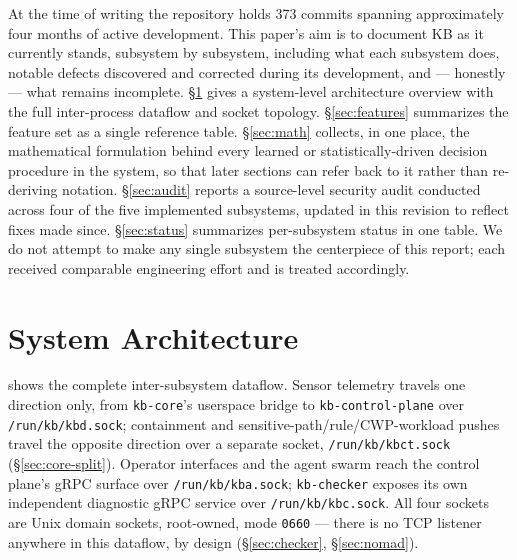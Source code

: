 \documentclass{article}
\begin{document}
At the time of writing the repository holds 373 commits spanning
approximately four months of active development. This paper's aim is
to document KB as it currently stands, subsystem by subsystem,
including what each subsystem does, notable defects discovered and
corrected during its development, and --- honestly --- what remains
incomplete. \S\ref{sec:arch} gives a system-level
architecture overview with the full inter-process dataflow and socket
topology. \S\ref{sec:features} summarizes the feature set as a single
reference table. \S\ref{sec:math} collects, in one place, the
mathematical formulation behind every learned or statistically-driven
decision procedure in the system, so that later sections can refer back
to it rather than re-deriving notation. \S\ref{sec:audit} reports a
source-level security audit conducted across four of the five
implemented subsystems, updated in this revision to reflect fixes made
since. \S\ref{sec:status} summarizes per-subsystem status in one table.
We do not attempt to make any single subsystem the centerpiece of this
report; each received comparable engineering effort and is treated
accordingly.

\section{System Architecture}
\label{sec:arch}

 shows the complete inter-subsystem dataflow. Sensor
telemetry travels one direction only, from \texttt{kb-core}'s userspace
bridge to \texttt{kb-control-plane} over \texttt{/run/kb/kbd.sock};
containment and sensitive-path/rule/CWP-workload pushes travel the
opposite direction over a separate socket, \texttt{/run/kb/kbct.sock}
(\S\ref{sec:core-split}). Operator interfaces and the agent swarm reach
the control plane's gRPC surface over \texttt{/run/kb/kba.sock};
\texttt{kb-checker} exposes its own independent diagnostic gRPC service
over \texttt{/run/kb/kbc.sock}. All four sockets are Unix domain
sockets, root-owned, mode \texttt{0660} --- there is no TCP listener
anywhere in this dataflow, by design (\S\ref{sec:checker},
\S\ref{sec:nomad}).
\end{document}
